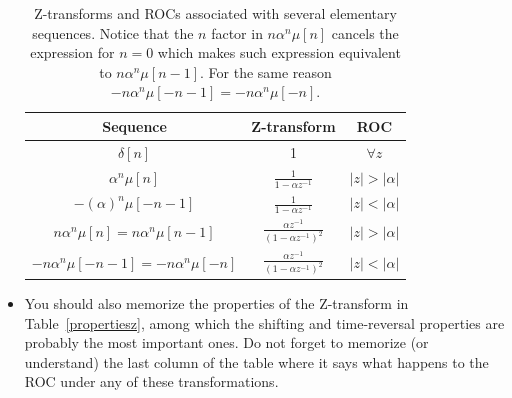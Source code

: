 \documentclass[a4paper,11pt,oneside]{article}
\begin{document}
\begin{itemize}
\begin{table}
\centering
\begin{tabular}{ccc}
\hline
Sequence & Z-transform & ROC\\
\hline
$\delta[n]$ & 1 & $\forall z$\vspace{.2cm}\\
$\alpha^n\mu[n]$ &  $\frac{1}{1-\alpha z^{-1}}$ & $|z|>|\alpha|$\vspace{.2cm}\\
$-(\alpha)^{n}\mu[-n-1]$ & $\frac{1}{1-\alpha z^{-1}}$ & $|z|<|\alpha|$\vspace{.2cm}\\
$n \alpha^n \mu[n]=n\alpha^n\mu[n-1]$ & $\frac{\alpha z^{-1}}{(1-\alpha z^{-1})^2}$ & $|z|>|\alpha|$\vspace{.2cm}\\
$-n\alpha^n \mu[-n-1]=-n\alpha^n\mu[-n]$ & $\frac{\alpha z^{-1}}{(1-\alpha z^{-1})^2}$ & $|z|<|\alpha|$\vspace{.2cm}\\
\hline
\end{tabular}
\caption{Z-transforms and ROCs associated with several elementary sequences. Notice that the $n$ factor in $n\alpha^n\mu[n]$ cancels the expression for $n=0$ which makes such expression equivalent to $n\alpha^n\mu[n-1]$. For the same reason $-n\alpha^n \mu[-n-1]=-n\alpha^n\mu[-n]$.}
\label{basicztransforms}
\end{table}

\item You should also memorize the properties of the Z-transform in Table~\ref{propertiesz}, among which the shifting and time-reversal properties are probably the most important ones. Do not forget to memorize (or understand) the last column of the table where it says what happens to the ROC under any of these transformations.



\end{itemize}
\end{document}
